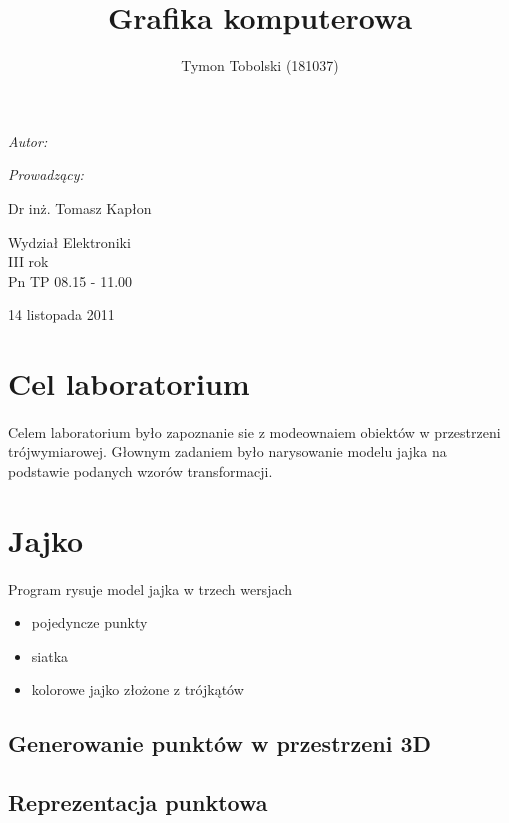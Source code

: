 \documentclass[wide,a4paper,titlepage,12pt] {article}
\title{Grafika komputerowa}
\author{Tymon Tobolski (181037)}
\makeatletter
\renewcommand{\maketitle}{
\begin{titlepage}
  \begin{center}
    \vspace*{3cm}
    \LARGE \@title \par
    \vspace{2cm}
    \textit{\small Autor:}\par
    \normalsize \@author\par \normalsize
    \vspace{3cm}
    \textit{\small Prowadzący:}\par
    Dr inż. Tomasz Kapłon \par
    \vspace{2cm}
    Wydział Elektroniki\\ III rok\\ Pn TP 08.15 - 11.00\par
    \vspace{4cm}
    \small 14 listopada 2011
  \end{center}
\end{titlepage}
}
\makeatother
\begin{document}
\maketitle
  \section{Cel laboratorium}
  \paragraph{}
  Celem laboratorium było zapoznanie sie z modeownaiem obiektów w przestrzeni trójwymiarowej.
  Głownym zadaniem było narysowanie modelu jajka na podstawie podanych wzorów transformacji.

  \section{Jajko}
  \paragraph{}
  Program rysuje model jajka w trzech wersjach
  \begin{itemize}
    \item pojedyncze punkty
    \item siatka
    \item kolorowe jajko złożone z trójkątów
  \end{itemize}

  \subsection{Generowanie punktów w przestrzeni 3D}
  \paragraph{}
  

  \subsection{Reprezentacja punktowa}
  \paragraph{}

  
\end{document}
